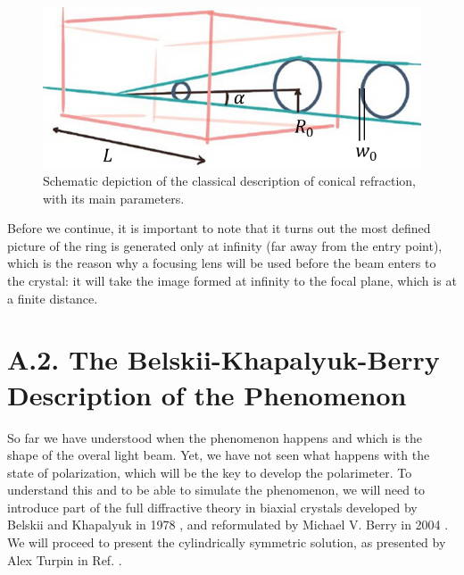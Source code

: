 \documentclass[11pt, a4paper, twoside]{article} %
\begin{document}
\begin{figure}[h!] 
     \centering 
         \includegraphics[width=0.5\linewidth]{cr.PNG}
    \caption{Schematic depiction of the classical description of conical refraction, with its main parameters.}
    \label{fig:CR}
\end{figure}
Before we continue, it is important to note that it turns out the most defined picture of the ring is generated only at infinity (far away from the entry point), which is the reason why a focusing lens will be used before the beam enters to the crystal: it will take the image formed at infinity to the focal plane, which is at a finite distance.


\section*{A.2. The Belskii-Khapalyuk-Berry Description of the Phenomenon }

So far we have understood when the phenomenon happens and which is the shape of the overal light beam. Yet, we have not seen what happens with the state of polarization, which will be the key to develop the polarimeter. To understand this and to be able to simulate the phenomenon, we will need to introduce part of the full diffractive theory in biaxial crystals developed by Belskii and Khapalyuk in 1978 \cite{BK1,BK2}, and reformulated by Michael V. Berry in 2004 \cite{Berry}. We will proceed to present the cylindrically symmetric solution, as presented by Alex Turpin in Ref. \cite{Turpin}.\vspace{-0.1cm}
\end{document}
